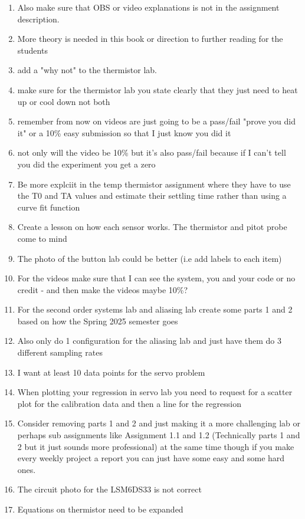 \begin{enumerate}[itemsep=-5pt]
\item Also make sure that OBS or video explanations is not in the assignment description.
\item More theory is needed in this book or direction to further
  reading for the students
\item add a "why not" to the thermistor lab.
\item make sure for the thermistor lab you state clearly that they just need to heat up or cool down not both
\item remember from now on videos are just going to be a pass/fail "prove you did it" or a 10\% easy submission so that I just know you did it
\item not only will the video be 10\% but it's also pass/fail because if I can't tell you did the experiment you get a zero
\item Be more explciit in the temp thermistor assignment where they have to use the T0 and TA values and estimate their settling time rather than using a curve fit function
\item Create a lesson on how each sensor works. The thermistor and pitot probe come to mind 
\item The photo of the button lab could be better (i.e add labels to
  each item)
\item For the videos make sure that I can see the system, you and your code or no credit - and then make the videos maybe 10\%?
\item For the second order systems lab and aliasing lab create some parts 1 and 2 based on how the Spring 2025 semester goes
\item Also only do 1 configuration for the aliasing lab and just have them do 3 different sampling rates
\item I want at least 10 data points for the servo problem
\item When plotting your regression in servo lab you need to request for a scatter plot for the calibration data and then a line for the regression
\item Consider removing parts 1 and 2 and just making it a more challenging lab or perhaps sub assignments like Assignment 1.1 and 1.2 (Technically parts 1 and 2 but it just sounds more professional) at the same time though if you make every weekly project a report you can just have some easy and some hard ones.
\item The circuit photo for the LSM6DS33 is not correct
\item Equations on thermistor need to be expanded

\end{enumerate}
